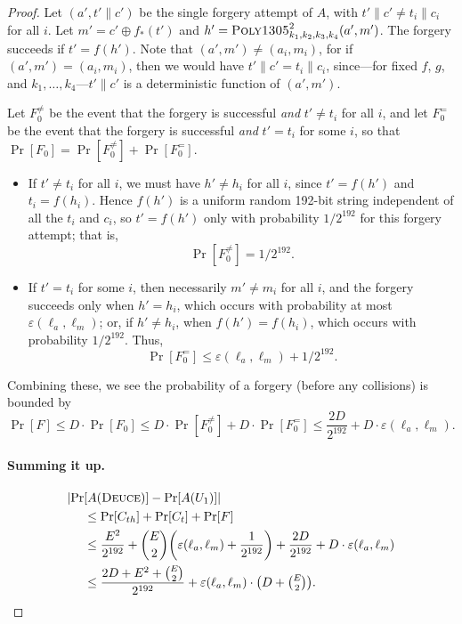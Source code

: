 \documentclass[draft]{article}
\DeclareRobustCommand{\operatorsc}[1]{{%
  \ifmmode\let\next=\operatorname\else\let\next=\relax\fi\next{\textsc{#1}}}}
\def\Poly#1/{\operatorsc{Poly#1}}
\def\Deuce/{\operatorsc{Deuce}}
\newcommand{\concat}{\mathbin\|}
\newcommand{\collisionbound}{\varepsilon}
\begin{document}
\begin{proof}
Let $(a', t' \concat c')$ be the single forgery attempt of $A$,
 with
 $t' \concat c' \ne t_i \concat c_i$
 for all $i$.
Let
 $m' = c' \oplus f_*(t')$
 and
 $h' = \Poly1305/^2_{k_1,k_2,k_3,k_4}(a', m')$.
The forgery succeeds if $t' = f(h')$.
Note that $(a', m') \ne (a_i, m_i)$, for if
 $(a', m') = (a_i, m_i)$,
 then we would have
 $t' \concat c' = t_i \concat c_i$, since---for fixed $f$, $g$, and
 $k_1,\dotsc,k_4$---$t' \concat c'$ is a deterministic function of
 $(a', m')$.

Let $F_0^{\ne}$ be the event that the forgery is successful \emph{and}
 $t' \ne t_i$ for all $i$, and let $F_0^=$ be the event that the
 forgery is successful \emph{and} $t' = t_i$ for some $i$, so that
 $\Pr[F_0] = \Pr[F_0^{\ne}] + \Pr[F_0^=]$.
%
\begin{itemize}
  \item
    If $t' \ne t_i$ for all $i$, we must have $h' \ne h_i$ for all $i$,
     since $t' = f(h')$ and $t_i = f(h_i)$.
    Hence $f(h')$ is a uniform random 192-bit string independent of all
     the $t_i$ and $c_i$, so $t' = f(h')$ only with probability
     $1/2^{192}$ for this forgery attempt; that is,
    \[
      \Pr[F_0^{\ne}] = 1/2^{192}.
    \]
  \item
    If $t' = t_i$ for some $i$, then necessarily $m' \ne m_i$ for all
     $i$, and the forgery succeeds only when $h' = h_i$, which occurs
     with probability at most $\collisionbound(\ell_a, \ell_m)$; or, if
     $h' \ne h_i$, when $f(h') = f(h_i)$, which occurs with probability
     $1/2^{192}$.
    Thus,
    \[
      \Pr[F_0^=] \leq \collisionbound(\ell_a, \ell_m) + 1/2^{192}.
    \]
\end{itemize}
%
Combining these, we see the probability of a forgery (before any
 collisions) is bounded by
\[
  \Pr[F]
  \leq D \cdot \Pr[F_0]
  \leq D \cdot \Pr[F_0^{\ne}] + D \cdot \Pr[F_0^=]
  \leq \frac{2 D}{2^{192}} + D \cdot \collisionbound(\ell_a, \ell_m).
\]

\paragraph*{Summing it up.}

\begin{align*}
  \lvert\Pr&[A(\Deuce/)] - \Pr[A(U_1)]\rvert \\
  &\leq \Pr[C_{th}] + \Pr[C_t] + \Pr[F] \\
  &\leq \frac{E^2}{2^{192}}
     + \binom{E}{2} \biggl(
         \collisionbound(\ell_a, \ell_m)
         + \frac{1}{2^{192}}
       \biggr)
     + \frac{2 D}{2^{192}} + D \cdot \collisionbound(\ell_a, \ell_m) \\
  &\leq \frac{2 D + E^2 + \binom{E}{2}}{2^{192}}
     + \collisionbound(\ell_a, \ell_m)
       \cdot
       {\textstyle\bigl(D + \binom{E}{2}\bigr)}.
  \qedhere
\end{align*}

\end{proof}

\end{document}
